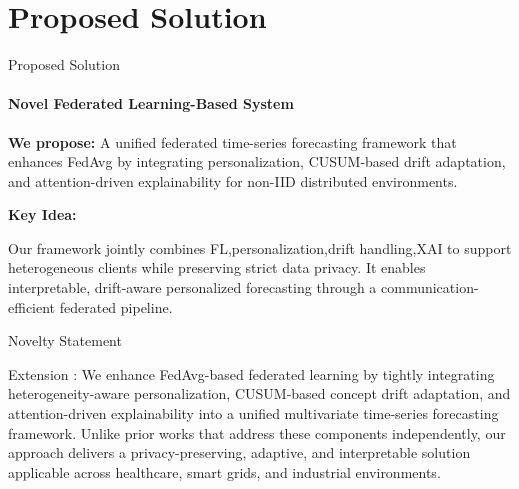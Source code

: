 \documentclass[aspectratio=169, 11pt]{beamer}
\begin{document}
\section{Proposed Solution}
\begin{frame}{Proposed Solution}
    \framesubtitle{Novel Federated Learning-Based System}

    \textbf{We propose:} A unified federated time-series forecasting framework that enhances FedAvg by integrating personalization, CUSUM-based drift adaptation, and attention-driven explainability for non-IID distributed environments.

    \vspace{0.3cm}
    \textbf{Key Idea:}
    \begin{itemize}
       Our framework jointly combines FL,personalization,drift handling,XAI to support heterogeneous clients while preserving strict data privacy. It enables interpretable, drift-aware personalized forecasting through a communication-efficient federated pipeline.
    \end{itemize}

    \vspace{0.1cm}
        \begin{block}{Novelty Statement}
        \begin{itemize}
        Extension :
 We enhance FedAvg-based federated learning by tightly integrating heterogeneity-aware personalization, CUSUM-based concept drift adaptation, and attention-driven explainability into a unified multivariate time-series forecasting framework. Unlike prior works that address these components independently, our approach delivers a privacy-preserving, adaptive, and interpretable solution applicable across healthcare, smart grids, and industrial environments.
        \end{itemize}
    \end{block}

    
\end{frame}
\end{document}
